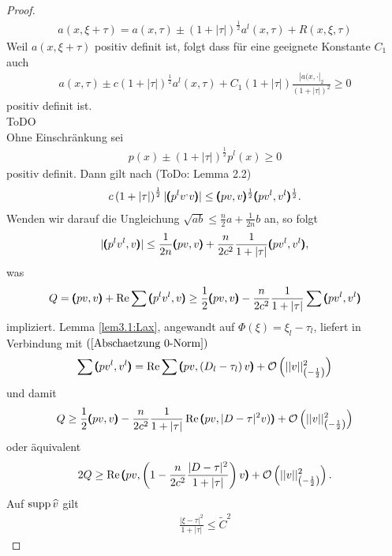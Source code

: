 \begin{proof}
\begin{align}
	a(x,\xi+\tau) = a(x,\tau)\pm(1+|\tau|)^{\frac{1}{2}}a^l(x,\tau) + R(x,\xi,\tau)
\end{align}
Weil $a(x,\xi+\tau)$ positiv definit ist, folgt dass für eine geeignete Konstante $C_1$ auch
\begin{align}
	a(x,\tau) \pm c(1+|\tau|)^{\frac{1}{2}}a^l(x,\tau)+C_1(1+| \tau|)\frac{| a(x,\cdot|_{2}}{\left(1+| \tau|\right)^2}\ge 0
\end{align}
positiv definit ist.\\
ToDO\\
Ohne Einschränkung sei 
\begin{align}
	p(x) \pm (1+| \tau|)^{\frac{1}{2}}p^l(x) \ge 0
\end{align}
positiv definit. Dann gilt nach (ToDo: Lemma 2.2)
\begin{align}
	c\left(1+|\tau|\right)^{\frac{1}{2}} |\pmb(p^lv^,v\pmb)|\le\pmb(pv,v\pmb)^{\frac{1}{2}}\pmb(pv^l,v^l\pmb)^{\frac{1}{2}}.
\end{align}
Wenden wir darauf die Ungleichung $\sqrt{ab}\le \frac{n}{2}a+\frac{1}{2n}b$ an, so folgt
\begin{align}
	|\pmb(p^lv^l,v\pmb)|\le \frac{1}{2n}\pmb(pv,v\pmb)+\frac{n}{2c^2}\frac{1}{1+|\tau|}\pmb(pv^l,v^l\pmb),
\end{align}
was 
\begin{align}
	Q=\pmb(pv,v\pmb)+\operatorname{Re}\sum\pmb(p^lv^l,v\pmb) \ge \frac{1}{2}\pmb(pv,v\pmb) -\frac{n}{2c^2}\frac{1}{1+| \tau|}\sum\pmb(pv^l,v^l\pmb)
\end{align}
impliziert. Lemma \ref{lem3.1:Lax}, angewandt auf $\Phi(\xi) = \xi_l-\tau_l$, liefert in Verbindung mit $(\ref{Abschaetzung 0-Norm})$
\begin{align}
\sum\pmb(pv^l,v^l\pmb)=\operatorname{Re}\sum \pmb(pv,\left(D_l-\tau_l\right)v\pmb)+\mathcal{O}\left(|| v||_{\left(-\frac{1}{2}\right)}^2\right) 
\end{align}
und damit
\begin{align}
	Q \ge \frac{1}{2}\pmb(pv,v\pmb)-\frac{n}{2c^2}\frac{1}{1+| \tau|}\operatorname{Re}\pmb(pv,| D-\tau|^2v)\pmb)+\mathcal{O}\left(|| v||_{\left(-\frac{1}{2}\right)}^2\right)
\end{align}
oder äquivalent
\begin{align}
	2Q \ge \operatorname{Re}\pmb(pv,\left(1-\frac{n}{2c^2}\frac{| D-\tau|^2}{1+|\tau|}\right)v\pmb)+\mathcal{O}\left(|| v||_{\left(-\frac{1}{2}\right)}^2\right).
\end{align}
Auf $\operatorname{supp}\widehat{v}$ gilt
\begin{align}
	\frac{|\xi-\tau|^2}{1+| \tau|}\le \tilde{C}^2 

\end{align}
\end{proof}
